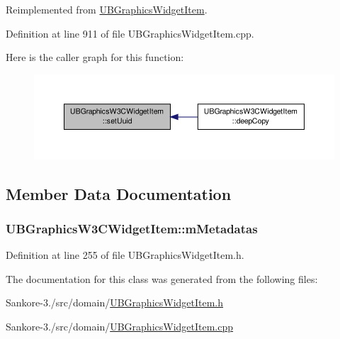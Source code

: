 Reimplemented from \hyperlink{class_u_b_graphics_widget_item_ad4cc767e9fb672aaaad3ce852249dd6e}{U\-B\-Graphics\-Widget\-Item}.



Definition at line 911 of file U\-B\-Graphics\-Widget\-Item.\-cpp.



Here is the caller graph for this function\-:
\nopagebreak
\begin{figure}[H]
\begin{center}
\leavevmode
\includegraphics[width=350pt]{d7/da7/class_u_b_graphics_w3_c_widget_item_ab094d8bf072b39d5c9bc8e9c82a07787_icgraph}
\end{center}
\end{figure}




\subsection{Member Data Documentation}
\hypertarget{class_u_b_graphics_w3_c_widget_item_a284f897d34b6a692ad2f774a6fb4acdf}{
\subsubsection[{m\-Metadatas}]{ U\-B\-Graphics\-W3\-C\-Widget\-Item\-::m\-Metadatas}}\label{d7/da7/class_u_b_graphics_w3_c_widget_item_a284f897d34b6a692ad2f774a6fb4acdf}


Definition at line 255 of file U\-B\-Graphics\-Widget\-Item.\-h.



The documentation for this class was generated from the following files\-:\begin{DoxyCompactItemize}
\item 
Sankore-\/3./src/domain/\hyperlink{_u_b_graphics_widget_item_8h}{U\-B\-Graphics\-Widget\-Item.\-h}\item 
Sankore-\/3./src/domain/\hyperlink{_u_b_graphics_widget_item_8cpp}{U\-B\-Graphics\-Widget\-Item.\-cpp}\end{DoxyCompactItemize}
